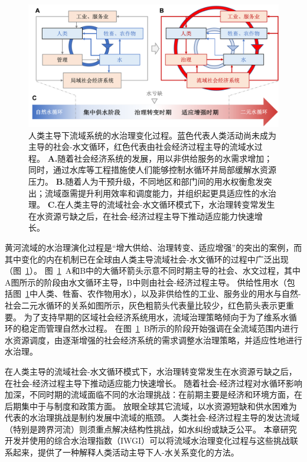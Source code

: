 \begin{figure}[!ht]
	\includegraphics[width=\textwidth]{img/ch4/ch4_transition.png}
	\caption[人类主导下流域系统的水治理阶段过渡]{
		人类主导下流域系统的水治理变化过程。蓝色代表人类活动尚未成为主导的社会-水文循环，红色代表由社会经济过程主导的流域水过程。
        \textbf{A.}随着社会经济系统的发展，用以非供给服务的水需求增加；同时，通过水库等工程措施使人们能够控制水循环并局部缓解水资源压力。
        \textbf{B.}随着人为干预升级，不同地区和部门间的用水权衡愈发突出；流域亟需提升利用效率和调度能力，并组织起更具适应性的水治理。
        \textbf{C.}在人类主导的流域社会-水文循环模式下，水治理转变常发生在水资源亏缺之后，在社会-经济过程主导下推动适应能力快速增长。
	}\label{fig:summary}
\end{figure}

黄河流域的水治理演化过程是“增大供给、治理转变、适应增强”的突出的案例，而其中变化的内在机制已在全球由人类主导流域社会-水文循环的过程中广泛出现（图~\ref{fig:summary}）。
图~\ref{fig:summary}~A和B中的大循环箭头示意不同时期主导的社会、水文过程，其中A图所示的阶段由水文循环主导，B中则由社会-经济过程主导。
供给性用水（包括图~\ref{fig:summary}中人类、牲畜、农作物用水），以及非供给性的工业、服务业的用水与自然-社会二元水循环的关系如图所示，灰色粗箭头代表量比较少，红色箭头表示更重要。
为了支持早期的区域社会经济系统用水，流域治理策略倾向于为了维系水循环的稳定而管理自然水过程。
在图~\ref{fig:summary}~B所示的阶段开始强调在全流域范围内进行水资源调度，由逐渐增强的社会经济系统的需求调整水治理策略，并适应性地进行水治理。

在人类主导的流域社会-水文循环模式下，水治理转变常发生在水资源亏缺之后，在社会-经济过程主导下推动适应能力快速增长。
随着社会-经济过程对水循环影响加深，不同时期的流域面临不同的水治理挑战：在前期主要是经济和环境方面，在后期集中于与制度和政策方面。
放眼全球其它流域，以水资源短缺和供水困难为代表的水治理挑战是制约发展中流域的瓶颈\cite{allan2019,speed2013,liu2012}。
人类社会-经济过程主导的发达流域（特别是跨界河流）则须重点解决结构性挑战，如水纠纷或缺乏公平\cite{mirumachi2015}。
本章研究开发并使用的综合水治理指数（IWGI）可以将流域水治理变化过程与这些挑战联系起来，提供了一种解释人类活动主导下人-水关系变化的方法。


